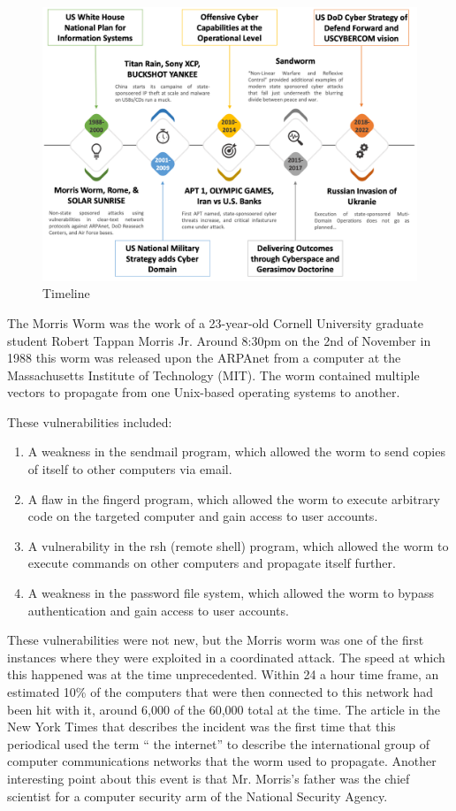 \documentclass[12pt]{report}
\begin{document}
\begin{figure}
	\centering
	\includegraphics[width=1\textwidth]{images/Timeline1.png}
	\caption{Timeline \protect}
	\label{fig:Timeline}
\end{figure}

The Morris Worm was the work of a 23-year-old Cornell University graduate student Robert Tappan Morris Jr.  Around 8:30pm on the 2nd of November in 1988 this worm was released upon the ARPAnet from a computer at the Massachusetts Institute of Technology (MIT).  The worm contained multiple vectors to propagate from one Unix-based operating systems to another.  

These vulnerabilities included:

\begin{enumerate}
  \item A weakness in the sendmail program, which allowed the worm to send copies of itself to other computers via email.
  \item A flaw in the fingerd program, which allowed the worm to execute arbitrary code on the targeted computer and gain access to user accounts.
  \item A vulnerability in the rsh (remote shell) program, which allowed the worm to execute commands on other computers and propagate itself further.
  \item A weakness in the password file system, which allowed the worm to bypass authentication and gain access to user accounts.
\end{enumerate}

These vulnerabilities were not new, but the Morris worm was one of the first instances where they were exploited in a coordinated attack.  The speed at which this happened was at the time unprecedented.  Within 24 a hour time frame, an estimated 10\% of the computers that were then connected to this network had been hit with it, around 6,000 of the 60,000 total at the time.  The article in the New York Times that describes the incident was the first time that this periodical used the term “ the internet” to describe the international group of computer communications networks that the worm used to propagate.  Another interesting point about this event is that Mr. Morris’s father was the chief scientist for a computer security arm of the National Security Agency.  
\end{document}
